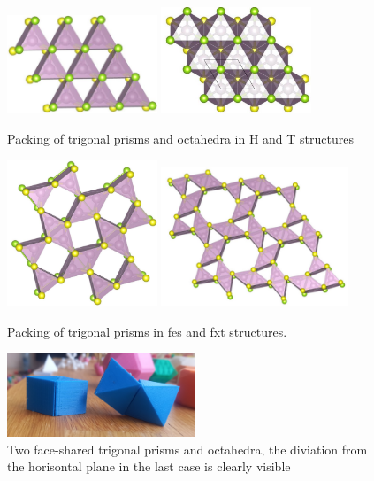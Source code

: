 \documentclass[a4paperm]{article}
\begin{document}
\begin{figure}[H]
        \includegraphics[width=0.4\textwidth]{1H.jpg}
        \includegraphics[width=0.4\textwidth]{1T.jpg}
        \caption{Packing of trigonal prisms and octahedra in H and T structures}
\label{1H1T}
\label{fes_fxt}
\end{figure}

\begin{figure}[H] \centering
	\includegraphics[width=0.4\textwidth]{fes_SMoSe.jpg}
        \includegraphics[width=0.5\textwidth]{fxt_SMoSe.jpg}
	\caption{Packing of trigonal prisms in fes and fxt structures.}
\label{fes_fxt}
\end{figure}

\begin{figure}[H] \centering
	\includegraphics[width=0.5\textwidth]{2prism_oct.jpg}
	\caption{Two face-shared trigonal prisms and octahedra, the diviation from the horisontal plane in the last case is clearly visible}
\label{2prism_oct.jpg}
\end{figure}
\end{document}
